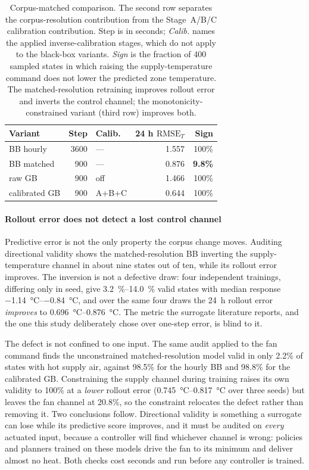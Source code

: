 \documentclass{ieeeaccess}
\newcommand{\RMSE}{\ensuremath{\mathrm{RMSE}}}
\begin{document}
\begin{table}[!t]
\centering
\caption{Corpus-matched comparison. The second row separates the corpus-resolution contribution
from the Stage~A/B/C calibration contribution. Step is in seconds; \emph{Calib.} names the
applied inverse-calibration stages, which do not apply to the black-box variants.
\emph{Sign} is the fraction of 400 sampled
states in which raising the supply-temperature command does not lower the predicted zone
temperature. The matched-resolution retraining improves rollout error and inverts the control
channel; the monotonicity-constrained variant (third row) improves both.}
\small
\begin{tabular}{@{}lrlrr@{}}
\toprule
Variant & Step & Calib. & 24 h $\RMSE_T$ & Sign \\
\midrule
BB hourly & 3600 & --- & 1.557 & 100\% \\
BB matched & 900 & --- & 0.876 & \textbf{9.8\%} \\
raw GB & 900 & off & 1.466 & 100\% \\
calibrated GB & 900 & A+B+C & 0.644 & 100\% \\
\bottomrule
\end{tabular}
\label{tab:matched}
\end{table}

\paragraph{Rollout error does not detect a lost control channel}
Predictive error is not the only property the corpus change moves. Auditing directional validity
shows the matched-resolution BB inverting the supply-temperature channel in about nine states out of
ten, while its rollout error improves. The inversion is not a defective draw: four independent
trainings, differing only in seed, give \SIrange{3.2}{14.0}{\percent} valid states with median
response \SIrange{-1.14}{-0.84}{\celsius}, and over the same four draws the 24~h rollout error
\emph{improves} to \SIrange{0.696}{0.876}{\celsius}. The metric the surrogate literature reports,
and the one this study deliberately chose over one-step error, is blind to it.

The defect is not confined to one input. The same audit applied to the fan command finds the
unconstrained matched-resolution model valid in only 2.2\% of states with hot supply air, against
98.5\% for the hourly BB and 98.8\% for the calibrated GB. Constraining the supply channel during
training raises its own validity to 100\% at a \emph{lower} rollout error
(\SIrange{0.745}{0.817}{\celsius} over three seeds) but leaves the fan channel at 20.8\%, so the
constraint relocates the defect rather than removing it. Two conclusions follow. Directional
validity is something a surrogate can lose while its predictive score improves, and it must be
audited on \emph{every} actuated input, because a controller will find whichever channel is wrong:
policies and planners trained on these models drive the fan to its minimum and deliver almost no
heat. Both checks cost seconds and run before any controller is trained.
\end{document}
